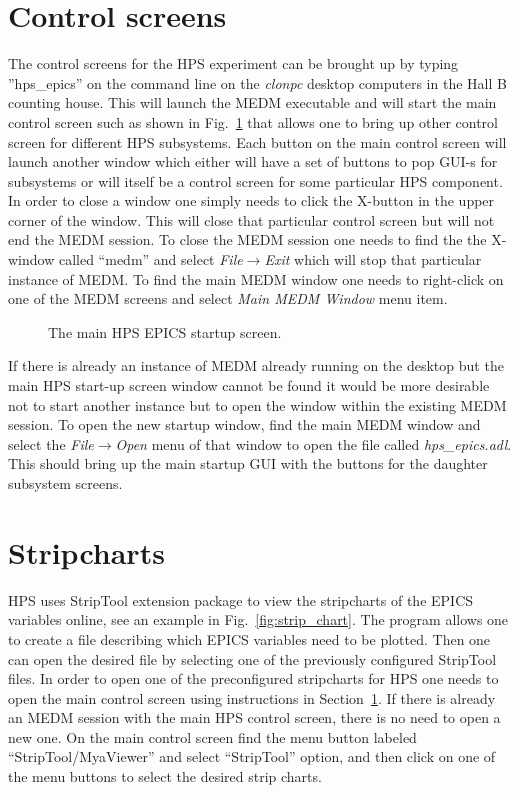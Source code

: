 \documentclass[letter,10pt]{article}
\begin{document}
\section{Control screens}
\label{sec:control_screens}
The control screens for the HPS experiment can be brought up by typing ''hps\_epics'' on the command line on the \textit{clonpc\*} desktop 
computers in the Hall B counting house. This will launch the MEDM executable and will start the  
main control screen such as shown in Fig.~\ref{fig:hps_epics_screen} that allows one to bring up other control screen for 
different HPS subsystems. 
Each button on the main control screen will launch another window which either will have a set of buttons to pop GUI-s for subsystems or will 
itself be a control screen for some particular HPS component. In order to close a window one simply needs to click the X-button in the upper 
corner of the window. This will close that particular control screen but will not end the MEDM session. To close the MEDM session one 
needs to find the the X-window called ``medm'' and select \textit{File}$\rightarrow$\textit{Exit} which will stop that particular instance of MEDM. 
To find the main MEDM window one needs to right-click on one of the MEDM screens and select \textit{Main MEDM Window} menu item. 
 \begin{figure}
  \centering
  \caption{The main HPS EPICS startup screen.} 
  \label{fig:hps_epics_screen}
 \end{figure}

If there is already an instance of MEDM already running on the desktop but the main HPS start-up screen window cannot be found it would be more 
desirable not to start another instance but to open the window within the existing MEDM session. To open the new startup window, find the main 
MEDM window and select the \textit{File}$\rightarrow$\textit{Open} menu of that window to open the file called \textit{hps\_epics.adl}. This should 
bring up the main startup GUI with the buttons for the daughter subsystem screens. 

\section{Stripcharts}
HPS uses StripTool extension package to view the stripcharts of the EPICS variables online, see an example 
in Fig.~\ref{fig:strip_chart}. 
The program allows one to create a file describing which EPICS variables need to be plotted. Then one 
can open the desired file by selecting one of the previously configured StripTool files.
In order to open one of the preconfigured stripcharts for HPS one needs to open the main control screen using instructions 
in Section~\ref{sec:control_screens}. If there is already an MEDM session with the main HPS control screen, there is no need to open 
a new one. On the main control screen find the menu button labeled ``StripTool/MyaViewer'' and select ``StripTool'' option, and then 
click on one of the menu buttons to select the desired strip charts. 
\end{document}
